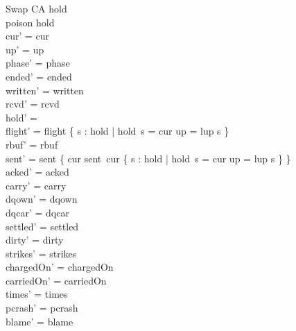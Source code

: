 \documentclass[a4paper,10pt,fleqn]{article}
\begin{document}
\begin{schema}{Swap}
  \Delta CA
\where
  hold \neq \emptyset \\
  poison \notin \dom hold \\
  cur' = cur \\
  up' = up \\
  phase' = phase \\
  ended' = ended \\
  written' = written \\
  rcvd' = rcvd \\
  hold' = \emptyset \\
  flight' = flight \cup \{ s : \dom hold | hold~s = cur \land up = lup \spot s \} \\
  rbuf' = rbuf \\
  sent' = sent \oplus \{ cur \mapsto sent~cur \cup \{ s : \dom hold | hold~s = cur \land up = lup \spot s \} \} \\
  acked' = acked \\
  carry' = carry \\
  dqown' = dqown \\
  dqcar' = dqcar \\
  settled' = settled \\
  dirty' = dirty \\
  strikes' = strikes \\
  chargedOn' = chargedOn \\
  carriedOn' = carriedOn \\
  times' = times \\
  pcrash' = pcrash \\
  blame' = blame
\end{schema}
\end{document}
